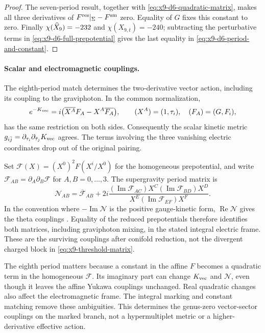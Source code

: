 \begin{proof}
The seven-period result, together with
\eqref{eq:x9-d6-quadratic-matrix}, makes all three derivatives of
$F^{\rm res}|_\Sigma-F^{\rm sm}$ zero. Equality of $G$ fixes this
constant to zero. Finally
$\chi(\widehat X_9)=-232$ and $\chi(X_{9,t})=-240$; subtracting the
perturbative terms in \eqref{eq:x9-d6-full-prepotential} gives the
last equality in \eqref{eq:x9-d6-period-and-constant}.
\end{proof}

\paragraph{Scalar and electromagnetic couplings.}
The eighth-period match determines the two-derivative vector action,
including its coupling to the graviphoton. In the common normalization,
\begin{equation}
 e^{-K_{\rm vec}}=i\bigl(\overline{X^A}F_A-X^A\overline{F_A}\bigr),
 \qquad (X^A)=(1,\tau_i),\quad (F_A)=(G,F_i),
 \label{eq:x9-d6-special-kahler}
\end{equation}
has the same restriction on both sides. Consequently the scalar kinetic
metric $g_{i\bar j}=\partial_{\tau_i}\partial_{\bar\tau_j}K_{\rm vec}$
agrees. The terms involving the three vanishing electric coordinates
drop out of the original pairing.

Set $\mathscr F(X)=(X^0)^2F(X^i/X^0)$ for the homogeneous prepotential, and write
$\mathscr F_{AB}=\partial_A\partial_B\mathscr F$ for $A,B=0,\ldots,3$.
The supergravity period matrix is
\begin{equation}
 \mathcal N_{AB}=\overline{\mathscr F}_{AB}
 +2i\frac{(\operatorname{Im}\mathscr F_{AC})X^C
                (\operatorname{Im}\mathscr F_{BD})X^D}
               {X^E(\operatorname{Im}\mathscr F_{EF})X^F}.
 \label{eq:x9-electromagnetic-couplings}
\end{equation}
In the convention where $-\operatorname{Im}\mathcal N$ is the
positive gauge-kinetic form, $\operatorname{Re}\mathcal N$ gives
the theta couplings \cite[Equations~(1.1) and~(4.22)]{crapsetal1997specialgeometry}.
Equality of the reduced prepotentials therefore identifies both matrices,
including graviphoton mixing, in the stated integral electric frame.
These are the surviving couplings after conifold reduction, not the
divergent charged block in \eqref{eq:x9-threshold-matrix}.

The eighth period matters because a constant in the affine $F$ becomes
a quadratic term in the homogeneous $\mathscr F$. Its imaginary part
can change $K_{\rm vec}$ and $\mathcal N$, even though it leaves the
affine Yukawa couplings unchanged. Real quadratic changes also affect
the electromagnetic frame. The integral marking and constant matching
remove these ambiguities. This determines the genus-zero vector-sector
couplings on the marked branch, not a hypermultiplet metric or a
higher-derivative effective action.
